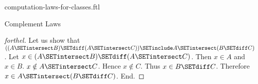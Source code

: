 \documentclass{naproche-library}
\begin{document}
\begin{smodule}[title=Computation Laws For Classes]{computation-laws-for-classes.ftl}
\begin{sfragment}{Complement Laws}
\begin{proof}[forthel]
    Let us show that $((A \SETintersect B) \SETdiff (A \SETintersect C)) \SETinclude A \SETintersect (B \SETdiff C)$. %
      Let $x \in (A \SETintersect B) \SETdiff (A \SETintersect C)$.
      Then $x \in A$ and $x \in B$.
      $x \notin A \SETintersect C$.
      Hence $x \notin C$.
      Thus $x \in B \SETdiff C$.
      Therefore $x \in A \SETintersect (B \SETdiff C)$.
    End.
  \end{proof}
\end{sfragment}
\end{smodule}
\end{document}
